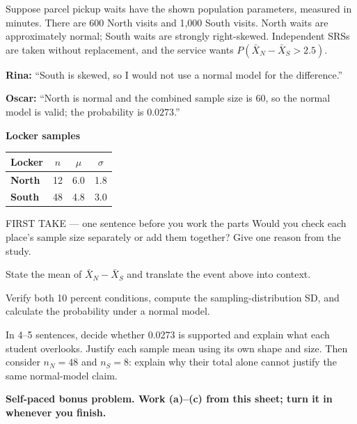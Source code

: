 \documentclass[14pt]{extarticle}
\begin{document}
\pagestyle{empty}


\noindent\begin{minipage}[t]{0.57\linewidth}
\vspace{0pt}
Suppose parcel pickup waits have the shown population parameters, measured in minutes. There are 600 North visits and 1,000 South visits. North waits are approximately normal; South waits are strongly right-skewed. Independent SRSs are taken without replacement, and the service wants $P(\bar X_N-\bar X_S>2.5)$.\par\smallskip \textbf{Rina:} ``South is skewed, so I would not use a normal model for the difference.''\par \textbf{Oscar:} ``North is normal and the combined sample size is 60, so the normal model is valid; the probability is $0.0273$.''\par
\end{minipage}\hfill
\begin{minipage}[t]{0.40\linewidth}
\vspace{0pt}
\begin{center}
\textbf{Locker samples}\par\smallskip
\begin{tabular}{|l|c|c|c|}
\hline
\textbf{Locker} & \textbf{$n$} & \textbf{$\mu$} & \textbf{$\sigma$} \\ \hline
\textbf{North} & 12 & 6.0 & 1.8 \\ \hline
\textbf{South} & 48 & 4.8 & 3.0 \\ \hline
\end{tabular}
\end{center}
\end{minipage}

\begin{firsttakebox}{FIRST TAKE --- one sentence before you work the parts}
Would you check each place's sample size separately or add them together? Give one reason from the study.
\end{firsttakebox}

\begin{description}[leftmargin=1.15in, labelwidth=1in, itemsep=2pt, topsep=2pt]
  \item[\dokbadge{1}~(a)] State the mean of $\bar X_N-\bar X_S$ and translate the event above into context.
  \item[\dokbadge{2}~(b)] Verify both 10 percent conditions, compute the sampling-distribution SD, and calculate the probability under a normal model.
  \item[\dokbadge{3}~(c)] In 4--5 sentences, decide whether 0.0273 is supported and explain what each student overlooks. Justify each sample mean using its own shape and size. Then consider $n_N=48$ and $n_S=8$: explain why their total alone cannot justify the same normal-model claim.
\end{description}

\vfill
\textbf{Self-paced bonus problem. Work (a)--(c) from this sheet; turn it in whenever you finish.}
\end{document}
